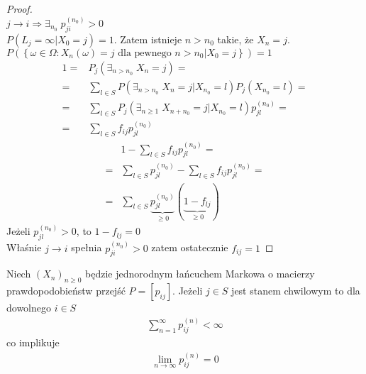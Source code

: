 \begin{proof}$  $\\
$ j \longrightarrow i \Rightarrow \exists_{n_0}\;p_{ji}^{(n_0)}>0$\\
$ P\left(L_j=\infty |X_0=j\right)=1 $. Zatem istnieje $ n>n_0 $ takie, że $ X_n=j $.\\
$ P\left(\left\{\omega\in\Omega:X_n(\omega)=j\text{ dla pewnego }n>n_0|X_0=j\right\}\right)=1 $
\begin{align*}
1=&P_j\left(\exists_{n>n_0}\;X_n=j\right)
=\\=&
\sum_{l\in S}P\left(\exists_{n>n_0}\;X_n=j|X_{n_0}=l\right)P_j\left(X_{n_0}=l\right)
=\\=&
\sum_{l\in S}P_j\left(\exists_{n\ge 1}\;X_{n+n_0}=j|X_{n_0}=l\right)p_{jl}^{(n_0)}
=\\=&
\sum_{l\in S}f_{ij}p_{jl}^{(n_0)}
\end{align*}
\begin{align*}
&1-\sum_{l\in S}f_{ij}p_{jl}^{(n_0)}
=\\=&
\sum_{l\in S}p_{jl}^{(n_0)}-\sum_{l\in S}f_{ij}p_{jl}^{(n_0)}
=\\=&
\sum_{l\in S}\underbrace{p_{jl}^{(n_0)}}_{\ge 0}(\underbrace{1-f_{lj}}_{\ge 0})
\end{align*}
Jeżeli $ p_{jl}^{(n_0)}>0 $, to $ 1-f_{lj}=0 $\\
Właśnie $ j\longrightarrow i $ spełnia $ p_{ji}^{(n_0)}>0 $ zatem ostatecznie $ f_{ij}=1 $
\end{proof}
\begin{lem}
Niech $ \left(X_n\right)_{n\ge 0} $ będzie jednorodnym łańcuchem Markowa o macierzy prawdopodobieństw przejść $ P=\left[p_{ij}\right] $. Jeżeli $ j\in S $ jest stanem chwilowym to dla dowolnego $ i\in S $
\begin{gather*}
\sum_{n=1}^{\infty }p_{ij}^{(n)}<\infty 
\end{gather*}
co implikuje
\begin{gather*}
\lim\limits_{n\to\infty} p_{ij}^{(n)}=0
\end{gather*}
\end{lem}
